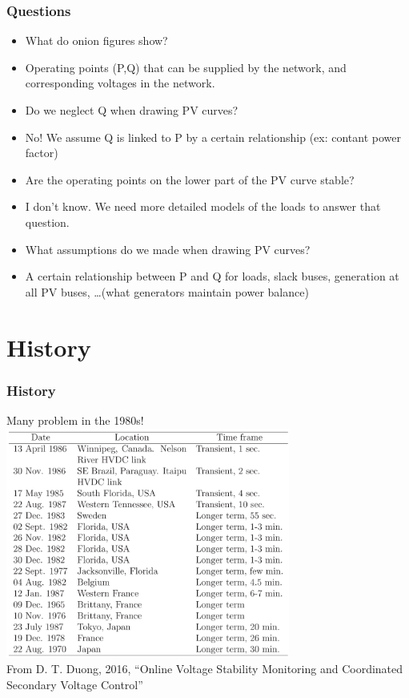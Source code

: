 \documentclass{beamer}
\begin{document}
\begin{frame}
  \frametitle{Questions}
  \begin{itemize}[<visible@+->]
  \item What do onion figures show?
  \item Operating points (P,Q) that can be supplied by the network, and corresponding voltages in the network.
  \item Do we neglect Q when drawing PV curves?
  \item No! We assume Q is linked to P by a certain relationship (ex: contant power factor)
  \item Are the operating points on the lower part of the PV curve stable?
  \item I don't know. We need more detailed models of the loads to answer that question.
  \item What assumptions do we made when drawing PV curves?
  \item A certain relationship between P and Q for loads, slack buses, generation at all PV buses, \ldots (what generators maintain power balance)
  \end{itemize}
\end{frame}

\section{History}
\begin{frame}
  \frametitle{History}
Many problem in the 1980s!
\includegraphics[width=0.7\textwidth]{Figs/VoltageProblem.png}\\
{\footnotesize From D. T. Duong, 2016, ``Online Voltage Stability Monitoring and Coordinated Secondary Voltage Control''}\\
\end{frame}
\end{document}

